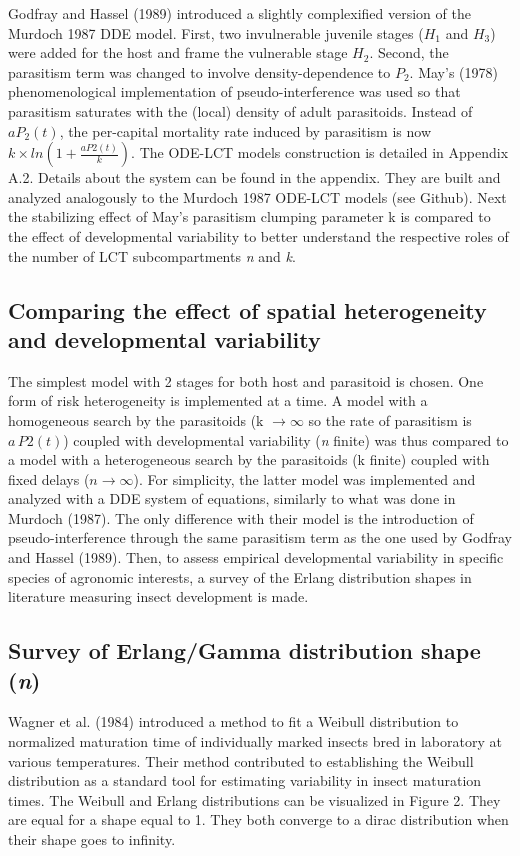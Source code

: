 \documentclass[12pt,a4paper,onecolumn]{article}
\begin{document}
\tabto{1 cm} Godfray and Hassel (1989) introduced a slightly complexified version of the Murdoch 1987 DDE model. First, two invulnerable juvenile stages ($H_1$ and $H_3$) were added for the host and frame the vulnerable stage $H_2$. Second, the parasitism term was changed to involve density-dependence to $P_2$. May's (1978) phenomenological implementation of pseudo-interference was used so that parasitism saturates with the (local) density of adult parasitoids. Instead of $a P_2(t)$, the per-capital mortality rate induced by parasitism is now $k \times ln\left(1 + \frac{a P2(t)}{k}\right)$. The ODE-LCT models construction is detailed in Appendix A.2. Details about the system can be found in the appendix. They are built and analyzed analogously to the Murdoch 1987 ODE-LCT models (see Github). Next the stabilizing effect of May's parasitism clumping parameter k is compared to the effect of developmental variability to better understand the respective roles of the number of LCT subcompartments \textit{n} and \textit{k}. 

\subsection{Comparing the effect of spatial heterogeneity and developmental variability}

\tabto{1 cm} The simplest model with 2 stages for both host and parasitoid is chosen. One form of risk heterogeneity is implemented at a time. A model with a homogeneous search by the parasitoids (k $\to \infty$ so the rate of parasitism is $a\,P2(t)$) coupled with developmental variability (\textit{n} finite) was thus compared to a model with a heterogeneous search by the parasitoids (k finite) coupled with fixed delays ($n \to \infty$). For simplicity, the latter model was implemented and analyzed with a DDE system of equations, similarly to what was done in Murdoch (1987). The only difference with their model is the introduction of pseudo-interference through the same parasitism term as the one used by Godfray and Hassel (1989). Then, to assess empirical developmental variability in specific species of agronomic interests, a survey of the Erlang distribution shapes in literature measuring insect development is made.

\subsection{Survey of Erlang/Gamma distribution shape (\textit{n})}
\tabto{1 cm} Wagner et al. (1984) introduced a method to fit a Weibull distribution to normalized maturation time of individually marked insects bred in laboratory at various temperatures. Their method contributed to establishing the Weibull distribution as a standard tool for estimating variability in insect maturation times. The Weibull and Erlang distributions can be visualized in Figure 2. They are equal for a shape equal to 1. They both converge to a dirac distribution when their shape goes to infinity. 
\end{document}
